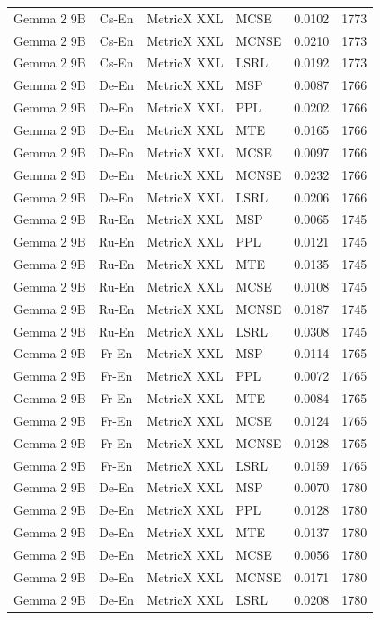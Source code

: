 \begin{table}
\begin{tabular}{lc}
Gemma 2 9B & Cs-En & MetricX XXL & MCSE & 0.0102 & 1773 \\
Gemma 2 9B & Cs-En & MetricX XXL & MCNSE & 0.0210 & 1773 \\
Gemma 2 9B & Cs-En & MetricX XXL & LSRL & 0.0192 & 1773 \\
Gemma 2 9B & De-En & MetricX XXL & MSP & 0.0087 & 1766 \\
Gemma 2 9B & De-En & MetricX XXL & PPL & 0.0202 & 1766 \\
Gemma 2 9B & De-En & MetricX XXL & MTE & 0.0165 & 1766 \\
Gemma 2 9B & De-En & MetricX XXL & MCSE & 0.0097 & 1766 \\
Gemma 2 9B & De-En & MetricX XXL & MCNSE & 0.0232 & 1766 \\
Gemma 2 9B & De-En & MetricX XXL & LSRL & 0.0206 & 1766 \\
Gemma 2 9B & Ru-En & MetricX XXL & MSP & 0.0065 & 1745 \\
Gemma 2 9B & Ru-En & MetricX XXL & PPL & 0.0121 & 1745 \\
Gemma 2 9B & Ru-En & MetricX XXL & MTE & 0.0135 & 1745 \\
Gemma 2 9B & Ru-En & MetricX XXL & MCSE & 0.0108 & 1745 \\
Gemma 2 9B & Ru-En & MetricX XXL & MCNSE & 0.0187 & 1745 \\
Gemma 2 9B & Ru-En & MetricX XXL & LSRL & 0.0308 & 1745 \\
Gemma 2 9B & Fr-En & MetricX XXL & MSP & 0.0114 & 1765 \\
Gemma 2 9B & Fr-En & MetricX XXL & PPL & 0.0072 & 1765 \\
Gemma 2 9B & Fr-En & MetricX XXL & MTE & 0.0084 & 1765 \\
Gemma 2 9B & Fr-En & MetricX XXL & MCSE & 0.0124 & 1765 \\
Gemma 2 9B & Fr-En & MetricX XXL & MCNSE & 0.0128 & 1765 \\
Gemma 2 9B & Fr-En & MetricX XXL & LSRL & 0.0159 & 1765 \\
Gemma 2 9B & De-En & MetricX XXL & MSP & 0.0070 & 1780 \\
Gemma 2 9B & De-En & MetricX XXL & PPL & 0.0128 & 1780 \\
Gemma 2 9B & De-En & MetricX XXL & MTE & 0.0137 & 1780 \\
Gemma 2 9B & De-En & MetricX XXL & MCSE & 0.0056 & 1780 \\
Gemma 2 9B & De-En & MetricX XXL & MCNSE & 0.0171 & 1780 \\
Gemma 2 9B & De-En & MetricX XXL & LSRL & 0.0208 & 1780 \\

\end{tabular}
\end{table}
